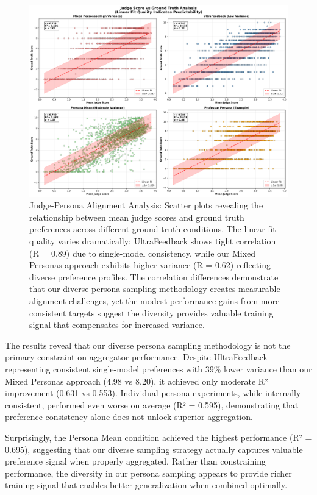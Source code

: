 \begin{figure}[htbp]
    \centering
    \includegraphics[width=\textwidth]{experiments/2b_aggregator_validation/experiment_results_full/plots/2_variance_scatter_analysis.png}
    \caption{Judge-Persona Alignment Analysis: Scatter plots revealing the relationship between mean judge scores and ground truth preferences across different ground truth conditions. The linear fit quality varies dramatically: UltraFeedback shows tight correlation (R = 0.89) due to single-model consistency, while our Mixed Personas approach exhibits higher variance (R = 0.62) reflecting diverse preference profiles. The correlation differences demonstrate that our diverse persona sampling methodology creates measurable alignment challenges, yet the modest performance gains from more consistent targets suggest the diversity provides valuable training signal that compensates for increased variance.}
    \label{fig:variance_scatter_analysis}
\end{figure}

The results reveal that our diverse persona sampling methodology is not the primary constraint on aggregator performance. Despite UltraFeedback representing consistent single-model preferences with 39\% lower variance than our Mixed Personas approach (4.98 vs 8.20), it achieved only moderate R² improvement (0.631 vs 0.553). Individual persona experiments, while internally consistent, performed even worse on average (R² = 0.595), demonstrating that preference consistency alone does not unlock superior aggregation.

Surprisingly, the Persona Mean condition achieved the highest performance (R² = 0.695), suggesting that our diverse sampling strategy actually captures valuable preference signal when properly aggregated. Rather than constraining performance, the diversity in our persona sampling appears to provide richer training signal that enables better generalization when combined optimally.

